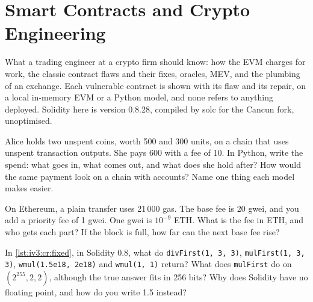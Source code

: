 \chapter{Smart Contracts and Crypto Engineering}\label{ch:iv3:smart-contracts-and-crypto-engineering}

\begin{ivtrains}
What a trading engineer at a crypto firm should know: how the EVM charges for work, the classic contract flaws and their fixes, oracles, MEV, and the plumbing of an exchange. Each vulnerable contract is shown with its flaw and its repair, on a local in-memory EVM or a Python model, and none refers to anything deployed. Solidity here is version 0.8.28, compiled by solc for the Cancun fork, unoptimised.
\end{ivtrains}

\begin{question}\label{iq:iv3:smart-contracts-and-crypto-engineering:1}
Alice holds two unspent coins, worth 500 and 300 units, on a chain that uses unspent transaction outputs. She pays 600 with a fee of 10. In Python, write the spend: what goes in, what comes out, and what does she hold after? How would the same payment look on a chain with accounts? Name one thing each model makes easier.
\end{question}

\begin{question}\label{iq:iv3:smart-contracts-and-crypto-engineering:2}
On Ethereum, a plain transfer uses 21\,000 gas. The base fee is 20 gwei, and you add a priority fee of 1 gwei. One gwei is $10^{-9}$ ETH. What is the fee in ETH, and who gets each part? If the block is full, how far can the next base fee rise?
\end{question}

\begin{question}\label{iq:iv3:smart-contracts-and-crypto-engineering:3}
In \cref{lst:iv3:cr:fixed}, in Solidity 0.8, what do \texttt{divFirst(1, 3, 3)}, \texttt{mulFirst(1, 3, 3)}, \texttt{wmul(1.5e18, 2e18)} and \texttt{wmul(1, 1)} return? What does \texttt{mulFirst} do on $(2^{255}, 2, 2)$, although the true answer fits in 256 bits? Why does Solidity have no floating point, and how do you write 1.5 instead?
\label{lst:iv3:cr:fixed}
\end{question}


